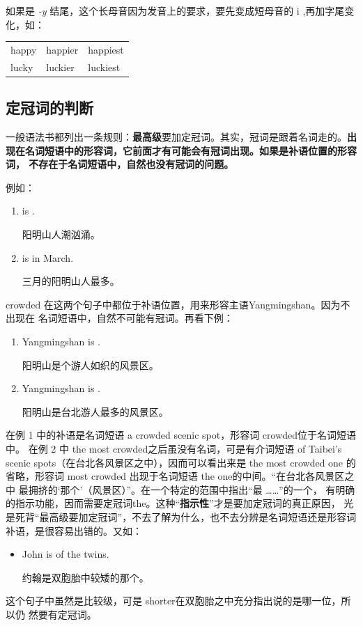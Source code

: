 如果是 \emph{-y} 结尾，这个长母音因为发音上的要求，要先变成短母音的 i
,再加字尾变化，如：
\begin{longtable}[]{@{}lll@{}}
  happy & happier & happiest \\
  lucky & luckier & luckiest \\
\end{longtable}

\subsection{定冠词的判断}

一般语法书都列出一条规则：\textbf{最高级}要加定冠词。其实，冠词是跟着名词走的。\textbf{出
  现在名词短语中的形容词，它前面才有可能会有冠词出现。如果是补语位置的形容词，
  不存在于名词短语中，自然也没有冠词的问题。}

例如：
\begin{enumerate}
\item  {} is .

  阳明山人潮汹涌。
\item  {} is  in March.

  三月的阳明山人最多。
\end{enumerate}
crowded 在这两个句子中都位于补语位置，用来形容主语Yangmingshan。因为不出现在
名词短语中，自然不可能有冠词。再看下例：
\begin{enumerate}
\item  Yangmingshan is .

  阳明山是个游人如织的风景区。
\item  Yangmingshan is .

  阳明山是台北游人最多的风景区。
\end{enumerate}
在例 1 中的补语是名词短语 a crowded scenic spot，形容词 crowded位于名词短语中。
在例 2 中 the most crowded之后虽没有名词，可是有介词短语 of Taibei's
scenic spots（在台北各风景区之中），因而可以看出来是 the most crowded one 的
省略，形容词 most crowded 出现于名词短语 the one的中间。“在台北各风景区之中
最拥挤的`那个'（风景区）”。在一个特定的范围中指出“最 \ldots \ldots”的一个，
有明确的指示功能，因而需要定冠词the。这种“\textbf{指示性}”才是要加定冠词的真正原因，
光是死背“最高级要加定冠词”，不去了解为什么，也不去分辨是名词短语还是形容词
补语，是很容易出错的。又如：

\begin{itemize}
\item  John is  of the twins.

  约翰是双胞胎中较矮的那个。
\end{itemize}
这个句子中虽然是比较级，可是 shorter在双胞胎之中充分指出说的是哪一位，所以仍
然要有定冠词。

